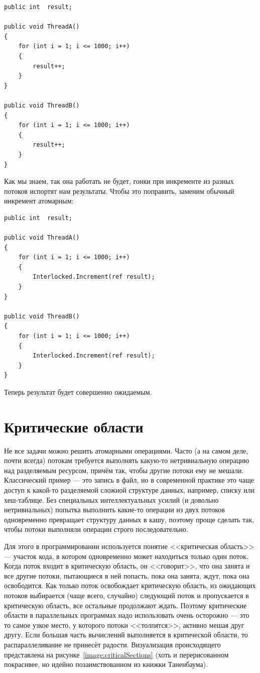 \documentclass[a5paper]{article}
\begin{document}
\begin{verbatim}
public int  result;

public void ThreadA()
{
    for (int i = 1; i <= 1000; i++) 
    {
        result++;
    }
}

public void ThreadB()
{
    for (int i = 1; i <= 1000; i++) 
    {
        result++; 
    }
}
\end{verbatim}

Как мы знаем, так она работать не будет, гонки при инкременте из разных потоков испортят нам результаты. Чтобы это поправить, заменим обычный инкремент атомарным:

\begin{verbatim}
public int  result;

public void ThreadA()
{
    for (int i = 1; i <= 1000; i++) 
    {
        Interlocked.Increment(ref result);
    }
}

public void ThreadB()
{
    for (int i = 1; i <= 1000; i++) 
    {
        Interlocked.Increment(ref result); 
    }
}
\end{verbatim}

Теперь результат будет совершенно ожидаемым.

\section{Критические области}

Не все задачи можно решить атомарными операциями. Часто (а на самом деле, почти всегда) потокам требуется выполнять какую-то нетривиальную операцию над разделяемым ресурсом, причём так, чтобы другие потоки ему не мешали. Классический пример --- это запись в файл, но в современной практике это чаще доступ к какой-то разделяемой сложной структуре данных, например, списку или хеш-таблице. Без специальных интеллектуальных усилий (и довольно нетривиальных) попытка выполнить какие-то операции из двух потоков одновременно превращает структуру данных в кашу, поэтому проще сделать так, чтобы потоки выполняли операции строго последовательно.

Для этого в программировании используется понятие <<критическая область>> --- участок кода,  в котором одновременно может находиться только один поток. Когда поток входит в критическую область, он <<говорит>>, что она занята и все другие потоки, пытающиеся в ней попасть, пока она занята, ждут, пока она освободится. Как только поток освобождает критическую область, из ожидающих потоков выбирается (чаще всего, случайно) следующий поток и пропускается в критическую область, все остальные продолжают ждать. Поэтому критические области в параллельных программах надо использовать очень осторожно --- это то самое узкое место, у которого потоки <<толпятся>>, активно мешая друг другу. Если большая часть вычислений выполняется в критической области, то распараллеливание не принесёт радости. Визуализация происходящего представлена на рисунке~\ref{image:criticalSections} (хоть и перерисованном покрасивее, но идейно позаимствованном из книжки Таненбаума).
\end{document}
